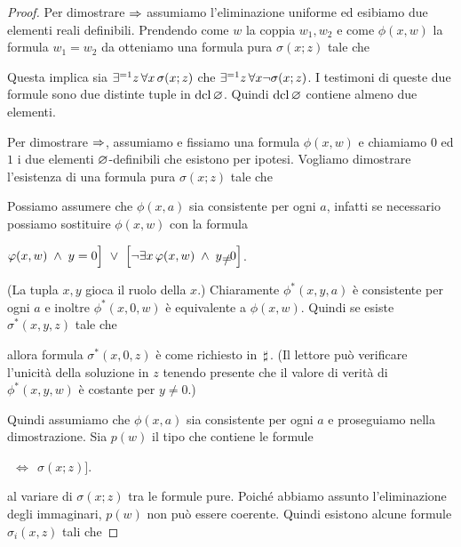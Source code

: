 \begin{proof} Per dimostrare $\Rightarrow$ assumiamo l'eliminazione uniforme ed esibiamo due elementi reali definibili. Prendendo come $w$ la coppia $w_1,w_2$ e come $\phi(x,w)$ la formula $w_1=w_2$ da  otteniamo una formula pura $\sigma(x;z)$ tale che 


Questa implica sia $\exists^{=1} z\,\forall x\,\sigma(x;z)$ che $\exists^{=1} z\,\forall x\neg\sigma(x;z)$. I testimoni di queste due formule sono due distinte tuple in $\mathop{\rm dcl}\varnothing$. Quindi $\mathop{\rm dcl}\varnothing$ contiene almeno due elementi.

Per dimostrare $\Rightarrow$, assumiamo  e fissiamo una formula $\phi(x,w)$ e chiamiamo $0$ ed $1$ i due elementi $\varnothing$-definibili che esistono per ipotesi. Vogliamo dimostrare l'esistenza di una formula pura $\sigma(x;z)$ tale che


Possiamo assumere che $\phi(x,a)$ sia consistente per ogni $a$, infatti se necessario possiamo sostituire $\phi(x,w)$ con la formula\smallskip

\hspace*{35ex}\llap{$\phi^*(x,y,w)\ \ =\ \ \Big[$}$\phi(x,w)\;\wedge\; y=0\Big]\ \vee\ \Big[\neg\E x\,\phi(x,w)\;\wedge\; y\neq0\Big]$.\smallskip

(La tupla $x,y$ gioca il ruolo della $x$.) Chiaramente $\phi^*(x,y,a)$ \`e consistente per ogni $a$ e inoltre  $\phi^*(x,0,w)$ \`e equivalente a $\phi(x,w)$. Quindi se esiste $\sigma^*(x,y,z)$ tale che


allora formula $\sigma^*(x,0,z)$ \`e come richiesto in $\,\sharp\,$. (Il lettore pu\`o  verificare l'unicit\`a della soluzione in $z$ tenendo presente che il valore di verit\`a di $\phi^*(x,y,w)$ \`e costante per $y\neq0$.)

Quindi assumiamo che $\phi(x,a)$ sia consistente per ogni $a$ e proseguiamo nella dimostrazione. Sia $p(w)$ il tipo che contiene le formule 

\hspace*{35ex}\llap{$\neg\,\E^{=1}z\,\A x\ \Big[\phi(x,w)$}$\ \ \iff\ \ \sigma(x;z)\Big]$.

al variare di $\sigma(x;z)$ tra le formule pure. Poich\'e abbiamo assunto l'eliminazione degli immaginari, $p(w)$ non pu\`o essere coerente. Quindi esistono alcune formule  $\sigma_i(x,z)$ tali che


\end{proof}
